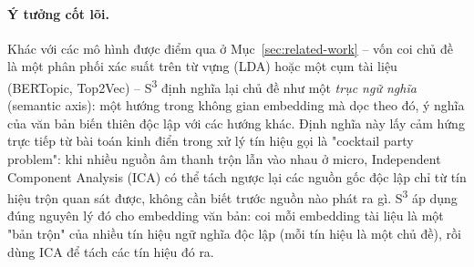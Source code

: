 \documentclass[11pt]{article}
\begin{document}
\paragraph{Ý tưởng cốt lõi.} Khác với các mô hình được điểm qua ở
Mục~\ref{sec:related-work} -- vốn coi chủ đề là một phân phối xác suất trên
từ vựng (LDA) hoặc một cụm tài liệu (BERTopic, Top2Vec) -- S\textsuperscript{3}
\citep{kardos2025s3} định nghĩa lại chủ đề như một \emph{trục ngữ nghĩa}
(semantic axis): một hướng trong không gian embedding mà dọc theo đó, ý
nghĩa của văn bản biến thiên độc lập với các hướng khác. Định nghĩa này lấy
cảm hứng trực tiếp từ bài toán kinh điển trong xử lý tín hiệu gọi là
"cocktail party problem": khi nhiều nguồn âm thanh trộn lẫn vào nhau ở micro,
Independent Component Analysis (ICA) \citep{jutten1991ica,hyvarinen2000fastica}
có thể tách ngược lại các nguồn gốc độc lập chỉ từ tín hiệu trộn quan sát
được, không cần biết trước nguồn nào phát ra gì. S\textsuperscript{3} áp
dụng đúng nguyên lý đó cho embedding văn bản: coi mỗi embedding tài liệu là
một "bản trộn" của nhiều tín hiệu ngữ nghĩa độc lập (mỗi tín hiệu là một chủ
đề), rồi dùng ICA để tách các tín hiệu đó ra.
\end{document}
